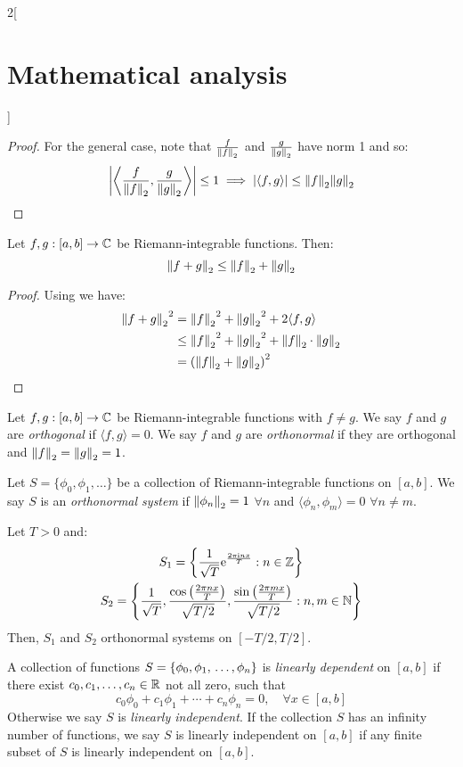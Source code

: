 \documentclass[../../../main_math.tex]{subfiles}
\begin{document}
\begin{multicols}{2}[\section{Mathematical analysis}]
\begin{proof}
    For the general case, note that $\frac{f}{{\left\|f\right\|_2}}$ and $\frac{g}{{\left\|g\right\|_2}}$ have norm 1 and so: $$\abs{\left\langle \frac{f}{{\left\|f\right\|_2}},\frac{g}{{\left\|g\right\|_2}}\right\rangle}\leq 1\implies\abs{\langle f,g\rangle}\leq{\left\|f\right\|_2}{\left\|g\right\|_2}$$
  \end{proof}
  \begin{theorem}
    Let $f,g:[a,b]\rightarrow\mathbb{C} $ be Riemann-integrable functions. Then: $$\left\|f+g\right\|_2\leq{\left\|f\right\|_2}+{\left\|g\right\|_2}$$
  \end{theorem}
  \begin{proof}
    Using  we have:
    \begin{align*}
      {\left\|f+g\right\|_2}^2 & ={\left\|f\right\|_2}^2+{\left\|g\right\|_2}^2+2\langle f,g\rangle              \\
                       & \leq{\left\|f\right\|_2}^2+{\left\|g\right\|_2}^2+{\left\|f\right\|_2}\cdot{\left\|g\right\|_2} \\
                       & ={\left({\left\|f\right\|_2}+{\left\|g\right\|_2}\right)}^2
    \end{align*}
  \end{proof}
  \begin{definition}
    Let $f,g:[a,b]\rightarrow\mathbb{C} $ be Riemann-integrable functions with $f\ne g$. We say $f$ and $g$ are \emph{orthogonal} if $\langle f,g\rangle=0$. We say $f$ and $g$ are \emph{orthonormal} if they are orthogonal and ${\left\|f\right\|_2}={\left\|g\right\|_2}=1$.
  \end{definition}
  \begin{definition}
    Let $S=\{\phi_0,\phi_1,\ldots\}$ be a collection of Riemann-integrable functions on $[a,b]$. We say $S$ is an \emph{orthonormal system} if $\left\|\phi_n\right\|_2=1$ $\forall n$ and $\langle\phi_n,\phi_m\rangle=0$ $\forall n\ne m$.
  \end{definition}
  \begin{proposition}
    Let $T>0$ and:
    \begin{gather*}
      S_1=\left\{\frac{1}{\sqrt{T}}\mathrm{e}^{\frac{2\pi\mathrm{i} nx}{T}}:n\in\mathbb{Z} \right\}\\ S_2=\left\{\frac{1}{\sqrt{T}},\frac{\cos\left(\frac{2\pi nx}{T}\right)}{\sqrt{T/2}},\frac{\sin\left(\frac{2\pi mx}{T}\right)}{\sqrt{T/2}}:n,m\in\mathbb{N} \right\}
    \end{gather*} Then, $S_1$ and $S_2$ orthonormal systems on $[-T/2,T/2]$.
  \end{proposition}
  \begin{definition}
    A collection of functions $S=\{\phi_0,\phi_1,\\\ldots,\phi_n\}$ is \emph{linearly dependent} on $[a,b]$ if there exist $c_0,c_1,\ldots,c_n\in\mathbb{R} $ not all zero, such that $$c_0\phi_0+c_1\phi_1+\cdots+c_n\phi_n=0,\quad\forall x\in[a,b]$$ Otherwise we say $S$ is \emph{linearly independent}. If the collection $S$ has an infinity number of functions, we say $S$ is linearly independent on $[a,b]$ if any finite subset of $S$ is linearly independent on $[a,b]$.

\end{definition}
\end{multicols}
\end{document}
